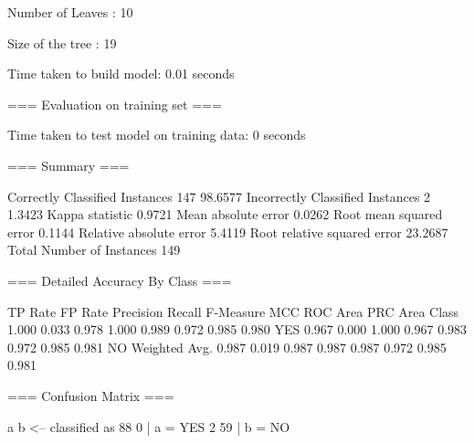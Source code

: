 Number of Leaves  : 	10

Size of the tree : 	19


Time taken to build model: 0.01 seconds

=== Evaluation on training set ===

Time taken to test model on training data: 0 seconds

=== Summary ===

Correctly Classified Instances         147               98.6577 %
Incorrectly Classified Instances         2                1.3423 %
Kappa statistic                          0.9721
Mean absolute error                      0.0262
Root mean squared error                  0.1144
Relative absolute error                  5.4119 %
Root relative squared error             23.2687 %
Total Number of Instances              149     

=== Detailed Accuracy By Class ===

                 TP Rate  FP Rate  Precision  Recall   F-Measure  MCC      ROC Area  PRC Area  Class
                 1.000    0.033    0.978      1.000    0.989      0.972    0.985     0.980     YES
                 0.967    0.000    1.000      0.967    0.983      0.972    0.985     0.981     NO
Weighted Avg.    0.987    0.019    0.987      0.987    0.987      0.972    0.985     0.981     

=== Confusion Matrix ===

  a  b   <-- classified as
 88  0 |  a = YES
  2 59 |  b = NO

